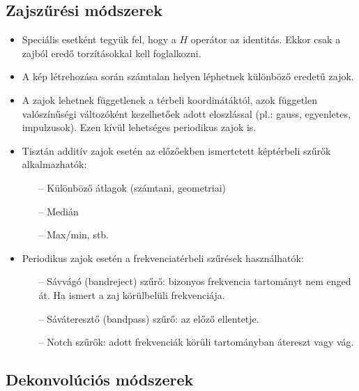 \documentclass[12pt]{article}
\theoremstyle{plain}
\begin{document}
\subsection{Zajszűrési módszerek}

\begin{itemize}
    \item Speciális esetként tegyük fel, hogy a $H$ operátor az identitás. Ekkor csak a zajból eredő torzításokkal kell foglalkozni.
    \item A kép létrehozása során számtalan helyen léphetnek különböző eredetű zajok.
    \item A zajok lehetnek függetlenek a térbeli koordinátáktól, azok független valószínűségi változóként kezelhetőek adott eloszlással (pl.: gauss, egyenletes, impulzusok). Ezen kívül lehetséges periodikus zajok is.
    \\
    \item Tisztán additív zajok esetén az előzőekben ismertetett képtérbeli szűrők alkalmazhatók:
    \begin{itemize}
        \item[--] Különböző átlagok (számtani, geometriai)
        \item[--] Medián
        \item[--] Max/min, stb.
    \end{itemize}{}
    \item Periodikus zajok esetén a frekvenciatérbeli szűrések használhatók:
    \begin{itemize}
        \item[--] Sávvágó (bandreject) szűrő: bizonyos frekvencia tartományt nem enged át. Ha ismert a zaj körülbelüli frekvenciája. 
        \item[--] Sáváteresztő (bandpass) szűrő: az előző ellentetje. 
        \item[--] Notch szűrők: adott frekvenciák körüli tartományban átereszt vagy vág.
    \end{itemize}{}
\end{itemize}{}

\subsection{Dekonvolúciós módszerek}
\end{document}
